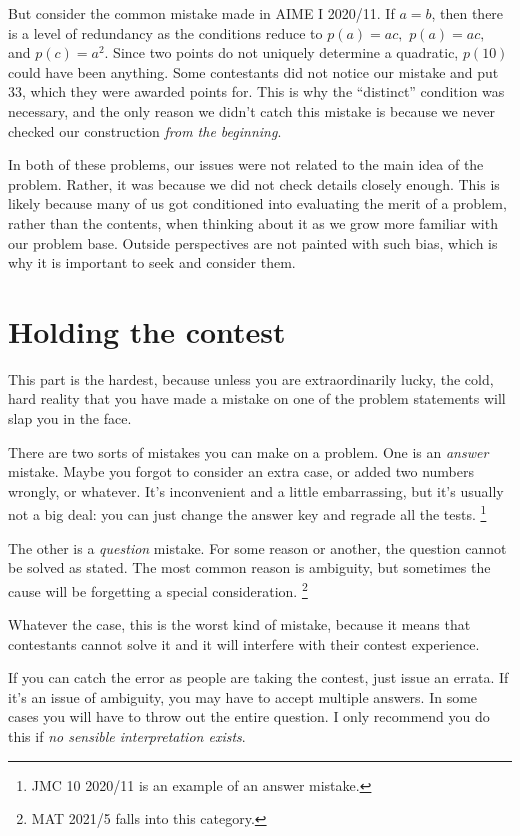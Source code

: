 \documentclass[points=false]{bounce}
\begin{document}
But consider the common mistake made in AIME I 2020/11. If $a=b$, then there is a level of redundancy as the conditions reduce to $p(a)=ac,$ $p(a)=ac,$ and $p(c)=a^2$. Since two points do not uniquely determine a quadratic, $p(10)$ could have been anything. Some contestants did not notice our mistake and put $33$, which they were awarded points for. This is why the ``distinct'' condition was necessary, and the only reason we didn't catch this mistake is because we never checked our construction \emph{from the beginning}.

In both of these problems, our issues were not related to the main idea of the problem. Rather, it was because we did not check details closely enough. This is likely because many of us got conditioned into evaluating the merit of a problem, rather than the contents, when thinking about it as we grow more familiar with our problem base. Outside perspectives are not painted with such bias, which is why it is important to seek and consider them.

\section{Holding the contest}

This part is the hardest,
because unless you are extraordinarily lucky,
the cold, hard reality that you have made a mistake
on one of the problem statements
will slap you in the face.

There are two sorts of mistakes
you can make on a problem.
One is an \emph{answer} mistake.
Maybe you forgot to consider an extra case,
or added two numbers wrongly,
or whatever. 
It's inconvenient and a little embarrassing,
but it's usually not a big deal:
you can just change the answer key and regrade
all the tests.
\footnote{JMC 10 2020/11 is an example of an answer mistake.}

The other is a \emph{question} mistake.
For some reason or another, the question
cannot be solved as stated.
The most common reason is ambiguity,
but sometimes the cause will be
forgetting a special consideration.
\footnote{MAT 2021/5 falls into this category.}

Whatever the case, this is the worst kind of mistake,
because it means that contestants cannot solve it
and it will interfere with their contest experience.

If you can catch the error as people are taking the contest,
just issue an errata.
If it's an issue of ambiguity, you may have to
accept multiple answers.
In some cases you will have to throw out the entire question.
I only recommend you do this
if \emph{no sensible interpretation exists}.
\end{document}
